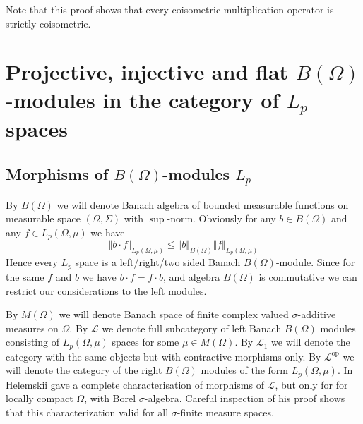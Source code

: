 \documentclass[12pt]{article}
\begin{document}
Note that this proof shows that every coisometric multiplication operator is strictly coisometric.



























\section{Projective, injective and flat \texorpdfstring{$B(\Omega)$}{B(Omega)}-modules in the category of \texorpdfstring{$L_p$}{Lp} spaces}

\subsection{Morphisms of \texorpdfstring{$B(\Omega)$}{B(Omega)}-modules \texorpdfstring{$L_p$}{Lp}}

By $B(\Omega)$ we will denote Banach algebra of bounded measurable functions on measurable space $(\Omega,\Sigma)$ with $\sup$-norm. Obviously for any $b\in B(\Omega)$ and any $f\in L_p(\Omega,\mu)$ we have
$$
\Vert b\cdot f\Vert_{L_p(\Omega,\mu)}
\leq\Vert b\Vert_{B(\Omega)}\Vert f\Vert_{L_p(\Omega,\mu)}
$$
Hence every $L_p$ space is a left/right/two sided Banach $B(\Omega)$-module. Since for the same $f$ and $b$ we have $b\cdot f=f\cdot b$, and algebra $B(\Omega)$ is commutative we can restrict our considerations to the left modules.

By $M(\Omega)$ we will denote Banach space of finite complex valued $\sigma$-additive measures on $\Omega$. By $\mathscr{L}$ we denote full subcategory of left Banach $B(\Omega)$ modules consisting of $L_p(\Omega,\mu)$ spaces for some $\mu\in M(\Omega)$. By $\mathscr{L}_1$ we will denote the  category with the same objects but with contractive morphisms only. By $\mathscr{L}^{\operatorname{op}}$ we will denote the category of the right $B(\Omega)$ modules of the form $L_p(\Omega,\mu)$. In \cite{HelTensProdAndMultModLp} Helemskii gave a complete characterisation of morphisms of $\mathscr{L}$, but only for for locally compact $\Omega$, with Borel $\sigma$-algebra. Careful inspection of his proof shows that this characterization valid for all $\sigma$-finite measure spaces.
\end{document}
